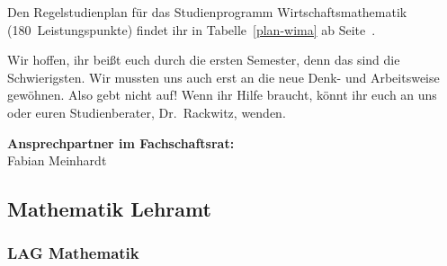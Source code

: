 Den Regelstudienplan für das Studienprogramm Wirtschaftsmathematik (180~Leistungspunkte) findet ihr in Tabelle~\ref{plan-wima} ab Seite~\pageref{plan-wima}.

Wir hoffen, ihr beißt euch durch die ersten Semester, denn das sind die Schwierigsten.
Wir mussten uns auch erst an die neue Denk- und Arbeitsweise gewöhnen.
Also gebt nicht auf!
Wenn ihr Hilfe braucht, könnt ihr euch an uns oder euren Studienberater, Dr.~Rackwitz, wenden.

\textbf{Ansprechpartner im Fachschaftsrat:}\\
Fabian Meinhardt\\



\subsection{Mathematik Lehramt}
\label{studiengang_lehramt}

\subsubsection{LAG Mathematik}
\label{studiengang_lag}

